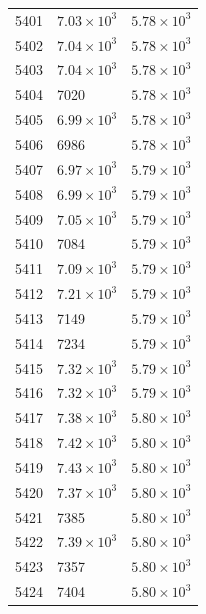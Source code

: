 \begin{table}[H]
\begin{tabular}{lll}
5401 & $\displaystyle 7.03 \times 10^{3}$ & $\displaystyle 5.78 \times 10^{3}$ \\
5402 & $\displaystyle 7.04 \times 10^{3}$ & $\displaystyle 5.78 \times 10^{3}$ \\
5403 & $\displaystyle 7.04 \times 10^{3}$ & $\displaystyle 5.78 \times 10^{3}$ \\
5404 & 7020 & $\displaystyle 5.78 \times 10^{3}$ \\
5405 & $\displaystyle 6.99 \times 10^{3}$ & $\displaystyle 5.78 \times 10^{3}$ \\
5406 & 6986 & $\displaystyle 5.78 \times 10^{3}$ \\
5407 & $\displaystyle 6.97 \times 10^{3}$ & $\displaystyle 5.79 \times 10^{3}$ \\
5408 & $\displaystyle 6.99 \times 10^{3}$ & $\displaystyle 5.79 \times 10^{3}$ \\
5409 & $\displaystyle 7.05 \times 10^{3}$ & $\displaystyle 5.79 \times 10^{3}$ \\
5410 & 7084 & $\displaystyle 5.79 \times 10^{3}$ \\
5411 & $\displaystyle 7.09 \times 10^{3}$ & $\displaystyle 5.79 \times 10^{3}$ \\
5412 & $\displaystyle 7.21 \times 10^{3}$ & $\displaystyle 5.79 \times 10^{3}$ \\
5413 & 7149 & $\displaystyle 5.79 \times 10^{3}$ \\
5414 & 7234 & $\displaystyle 5.79 \times 10^{3}$ \\
5415 & $\displaystyle 7.32 \times 10^{3}$ & $\displaystyle 5.79 \times 10^{3}$ \\
5416 & $\displaystyle 7.32 \times 10^{3}$ & $\displaystyle 5.79 \times 10^{3}$ \\
5417 & $\displaystyle 7.38 \times 10^{3}$ & $\displaystyle 5.80 \times 10^{3}$ \\
5418 & $\displaystyle 7.42 \times 10^{3}$ & $\displaystyle 5.80 \times 10^{3}$ \\
5419 & $\displaystyle 7.43 \times 10^{3}$ & $\displaystyle 5.80 \times 10^{3}$ \\
5420 & $\displaystyle 7.37 \times 10^{3}$ & $\displaystyle 5.80 \times 10^{3}$ \\
5421 & 7385 & $\displaystyle 5.80 \times 10^{3}$ \\
5422 & $\displaystyle 7.39 \times 10^{3}$ & $\displaystyle 5.80 \times 10^{3}$ \\
5423 & 7357 & $\displaystyle 5.80 \times 10^{3}$ \\
5424 & 7404 & $\displaystyle 5.80 \times 10^{3}$ \\

\end{tabular}
\end{table}
